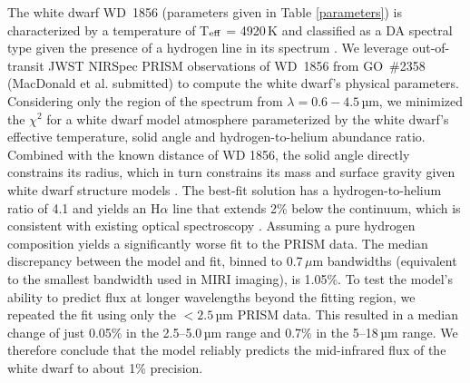 \documentclass[twocolumn]{aastex631}
\begin{document}
The white dwarf WD~1856 (parameters given in Table \ref{parameters}) is characterized by a temperature of T$_{\rm eff}$ = 4920\,K and classified as a DA spectral type given the presence of a hydrogen line in its spectrum \citep{2021AJ....162..296X}. 
We leverage out-of-transit JWST NIRSpec PRISM observations of WD~1856 from GO~\#2358 (MacDonald et al. submitted) to compute the white dwarf's physical parameters. Considering only the region of the spectrum from $\lambda = 0.6-4.5$\,µm, we minimized the $\chi^2$ for a white dwarf model atmosphere \citep{blouin2018a,blouin2018b} parameterized by the white dwarf's effective temperature, solid angle and hydrogen-to-helium abundance ratio. Combined with the known distance of WD 1856, the solid angle directly constrains its radius, which in turn constrains its mass and surface gravity given white dwarf structure models \citep{2020ApJ...901...93B}. The best-fit solution has a hydrogen-to-helium ratio of 4.1 and yields an H$\alpha$ line that extends 2\% below the continuum, which is consistent with existing optical spectroscopy \citep[][not considered here in our fit]{2021A&A...649A.131A,2021AJ....162..296X}. Assuming a pure hydrogen composition yields a significantly worse fit to the PRISM data. { The median discrepancy between the model and fit, binned to 0.7\,$\mu$m bandwidths (equivalent to the smallest bandwidth used in MIRI imaging), is 1.05\%. To test the model's ability to predict flux at longer wavelengths beyond the fitting region, we repeated the fit using only the $<2.5$\,µm PRISM data. This resulted in a median change of just 0.05\% in the 2.5–5.0\,µm range and 0.7\% in the 5–18\,µm range. We therefore conclude that the model reliably predicts the mid-infrared flux of the white dwarf to about 1\% precision.
}
\end{document}
